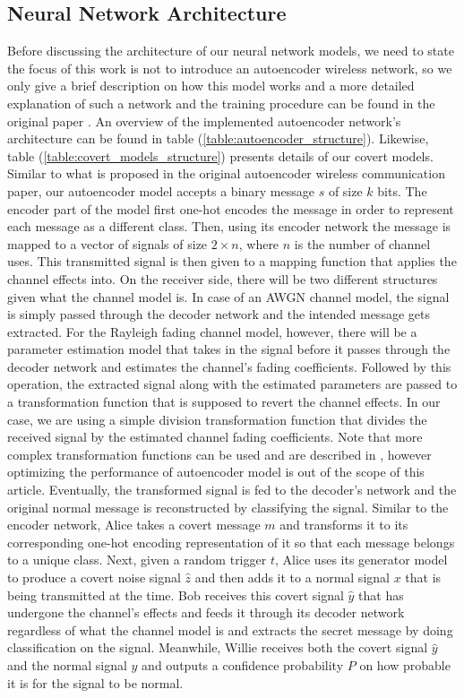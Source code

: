 \subsection{Neural Network Architecture}
Before discussing the architecture of our neural network models, we need to state the focus of this work is not to introduce an autoencoder wireless network, so we only give a brief description on how this model works and a more detailed explanation of such a network and the training procedure can be found in the original paper \cite{o2017introduction}. An overview of the implemented autoencoder network's architecture can be found in table (\ref{table:autoencoder_structure}). Likewise, table (\ref{table:covert_models_structure}) presents details of our covert models.\\
Similar to what is proposed in the original autoencoder wireless communication paper, our autoencoder model accepts a binary message \(s\) of size \(k\) bits. The encoder part of the model first one-hot encodes the message in order to represent each message as a different class. Then, using its encoder network the message is mapped to a vector of signals of size \(2 \times n\), where \(n\) is the number of channel uses. This transmitted signal is then given to a mapping function that applies the channel effects into. On the receiver side, there will be two different structures given what the channel model is. In case of an AWGN channel model, the signal is simply passed through the decoder network and the intended message gets extracted. For the Rayleigh fading channel model, however, there will be a parameter estimation model that takes in the signal before it passes through the decoder network and estimates the channel's fading coefficients. Followed by this operation, the extracted signal along with the estimated parameters are passed to a transformation function that is supposed to revert the channel effects. In our case, we are using a simple division transformation function that divides the received signal by the estimated channel fading coefficients. Note that more complex transformation functions can be used and are described in \cite{o2017introduction}, however optimizing the performance of autoencoder model is out of the scope of this article. Eventually, the transformed signal is fed to the decoder's network and the original normal message is reconstructed by classifying the signal. Similar to the encoder network, Alice takes a covert message \(m\) and transforms it to its corresponding one-hot encoding representation of it so that each message belongs to a unique class. Next, given a random trigger \(t\), Alice uses its generator model to produce a covert noise signal \(\hat{z}\) and then adds it to a normal signal \(x\) that is being transmitted at the time. Bob receives this covert signal \(\hat{y}\) that has undergone the channel's effects and feeds it through its decoder network regardless of what the channel model is and extracts the secret message by doing classification on the signal. Meanwhile, Willie receives both the covert signal \(\hat{y}\) and the normal signal \(y\) and outputs a confidence probability \(P\) on how probable it is for the signal to be normal.
